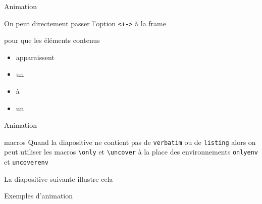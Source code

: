 \documentclass[french]{beamer}
\begin{document}
  \begin{frame}[<+->][fragile]{Animation}
    \begin{block}{}
      On peut directement passer l'option \verb:<+->: à la frame
    \end{block}
    \begin{block}{}
      pour que les éléments contenus
    \end{block}
    \begin{block}{}
      \begin{itemize}
        \item apparaissent
        \item un
        \item à
        \item un
      \end{itemize}
    \end{block}
  \end{frame}
  
  \begin{frame}[fragile]{Animation}
    \begin{block}{macros}
      Quand la diapositive ne contient pas de \texttt{verbatim} ou de \texttt{listing} alors on peut utiliser les macros \verb:\only: et \verb:\uncover: à la place des environnements \verb:onlyenv: et \verb:uncoverenv:
      \begin{code}
      \end{code}
      La diapositive suivante illustre cela
    \end{block}
  \end{frame}
  
  \begin{frame}{Exemples d'animation}
  \end{frame}
  
\end{document}
